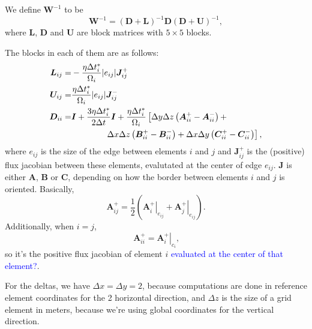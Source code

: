 \documentclass[12pt]{article}
\newcommand{\todo}[1]{\textcolor{blue}{#1}}
\begin{document}
We define $\bm{W}^{-1}$ to be
\begin{equation}
    \bm{W}^{-1} = (\bm{D} + \bm{L})^{-1} \bm{D} (\bm{D} + \bm{U})^{-1},
\end{equation}
where $\bm{L}$, $\bm{D}$ and $\bm{U}$ are block matrices with $5 \times 5$ blocks.

The blocks in each of them are as follows:
\begin{subequations}\label{eq:paper_lower_upper_diag}
\begin{align}
    \bm{L}_{ij} =& -\dfrac{\eta \Delta t_i^*}{\Omega_i} |e_{ij}| \bm{J}_{ij}^+ \label{eq:Lij}\\
    \bm{U}_{ij} =&  \dfrac{\eta \Delta t_i^*}{\Omega_i} |e_{ij}| \bm{J}_{ij}^- \\
    \bm{D}_{ii} =& \bm{I} + \dfrac{3\eta\Delta t_i^*}{2\Delta t} \bm{I} + 
                   \dfrac{\eta\Delta t_i^*}{\Omega_i} \left[
                     \Delta y \Delta z \left( \bm{A}_{ii}^+ - \bm{A}_{ii}^- \right) + \right.
                \notag\\ &\qquad\qquad \label{eq:Dij}
                   \left.\Delta x \Delta z \left( \bm{B}_{ii}^+ - \bm{B}_{ii}^- \right) +
                     \Delta x \Delta y \left( \bm{C}_{ii}^+ - \bm{C}_{ii}^- \right)
                   \right]
                   \text{,}
\end{align}
\end{subequations}
where $e_{ij}$ is the size of the edge between elements $i$ and $j$ and $\bm{J}_{ij}^+$ is the (positive) flux jacobian between these elements, evalutated at the center of edge $e_{ij}$. $\bm{J}$ is either $\bm{A}$, $\bm{B}$ or $\bm{C}$, depending on how the border between elements $i$ and $j$ is oriented. Basically,
\begin{equation}
    \bm{A}_{ij}^+ = \dfrac{1}{2} \left( \left.\bm{A}_i^+\right|_{e_{ij}} + \left.\bm{A}_j^+\right|_{e_{ij}}\right)
    \text{.}
\end{equation}
Additionally, when $i = j$,
\begin{equation}
    \bm{A}_{ii}^+ = \left. \bm{A}_i^+ \right|_{c_i}
    \text{,}
\end{equation}
so it's the positive flux jacobian of element $i$ \todo{evaluated at the center of that element?}.

For the deltas, we have $\Delta x = \Delta y = 2$, because computations are done in reference element coordinates for the 2 horizontal direction, and $\Delta z$ is the size of a grid element in meters, because we're using global coordinates for the vertical direction.
\end{document}
